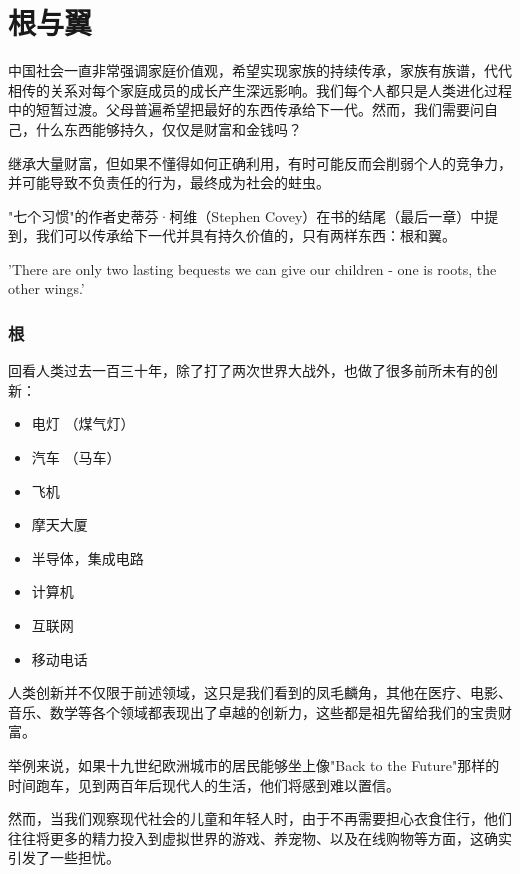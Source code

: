 \chapter{根与翼} %

中国社会一直非常强调家庭价值观，希望实现家族的持续传承，家族有族谱，代代相传的关系对每个家庭成员的成长产生深远影响。我们每个人都只是人类进化过程中的短暂过渡。父母普遍希望把最好的东西传承给下一代。然而，我们需要问自己，什么东西能够持久，仅仅是财富和金钱吗？

继承大量财富，但如果不懂得如何正确利用，有时可能反而会削弱个人的竞争力，并可能导致不负责任的行为，最终成为社会的蛀虫。

"七个习惯"的作者史蒂芬·柯维（Stephen
Covey）在书的结尾（最后一章）中提到，我们可以传承给下一代并具有持久价值的，只有两样东西：根和翼。

'There are only two lasting bequests we can give our children - one is
roots, the other wings.'

\hypertarget{ux6839}{%
\subsection{根}\label{ux6839}}

回看人类过去一百三十年，除了打了两次世界大战外，也做了很多前所未有的创新：

\begin{itemize}
\tightlist
\item
  电灯 （煤气灯）
\item
  汽车 （马车）
\item
  飞机
\item
  摩天大厦
\item
  半导体，集成电路
\item
  计算机
\item
  互联网
\item
  移动电话
\end{itemize}

人类创新并不仅限于前述领域，这只是我们看到的凤毛麟角，其他在医疗、电影、音乐、数学等各个领域都表现出了卓越的创新力，这些都是祖先留给我们的宝贵财富。

举例来说，如果十九世纪欧洲城市的居民能够坐上像"Back to the
Future"那样的时间跑车，见到两百年后现代人的生活，他们将感到难以置信。

然而，当我们观察现代社会的儿童和年轻人时，由于不再需要担心衣食住行，他们往往将更多的精力投入到虚拟世界的游戏、养宠物、以及在线购物等方面，这确实引发了一些担忧。

